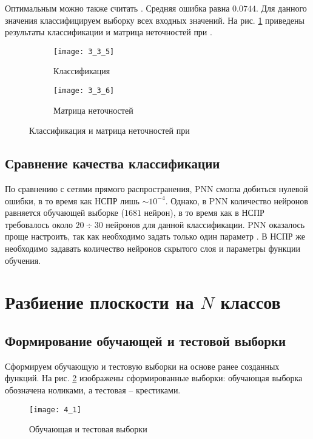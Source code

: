 Оптимальным можно также считать . Средняя ошибка равна $0.0744$. Для данного значения классифицируем выборку всех входных значений. На рис. \ref{fig:3_3_5} приведены результаты классификации и матрица неточностей при .
\vspace{-0.5cm}
\begin{figure}[H]
\begin{center}
	\begin{subfigure}{0.49\textwidth}
		\texttt{[image: 3\_3\_5]}
		\caption{Классификация}
	\end{subfigure}
	\begin{subfigure}{0.47\textwidth}
		\texttt{[image: 3\_3\_6]}
		\caption{Матрица неточностей}
	\end{subfigure}
	\caption{Классификация и матрица неточностей при }
	\label{fig:3_3_5}
\end{center}
\end{figure}

\subsection{Сравнение качества классификации}


По сравнению с сетями прямого распространения, PNN смогла добиться нулевой ошибки, в то время как НСПР лишь $\sim 10^{-4}$. Однако, в PNN количество нейронов равняется обучающей выборке ($1681$ нейрон), в то время как в НСПР требовалось около $20 \div 30$ нейронов для данной классификации. PNN оказалось проще настроить, так как необходимо задать только один параметр . В НСПР же необходимо задавать количество нейронов скрытого слоя и параметры функции обучения.

\section{Разбиение плоскости на $N$ классов}

\subsection{Формирование обучающей и тестовой выборки}

Сформируем обучающую и тестовую выборки на основе ранее созданных функций. На рис. \ref{fig:4_1} изображены сформированные выборки: обучающая выборка обозначена ноликами, а тестовая -- крестиками.
\begin{figure}[H]
\begin{center}
	\texttt{[image: 4\_1]}
	\caption{Обучающая и тестовая выборки}
	\label{fig:4_1}
\end{center}
\end{figure}


